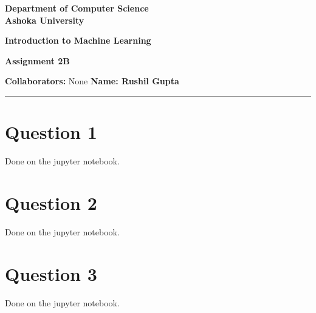 \documentclass[a4paper]{article}
\begin{document}
\begin{center}
{\large \bf \color{red} Department of Computer Science} \\
{\large \bf \color{red} Ashoka University} \\

\vspace{0.1in}

{\large \bf \color{blue} Introduction to Machine Learning}

\vspace{0.05in}

{ \bf \color{YellowOrange} Assignment 2B}
\end{center}
\medskip

{\textbf{Collaborators:} None} \hfill {\textbf{Name: Rushil Gupta} }

\bigskip
\hrule

\section*{Question 1}
Done on the jupyter notebook.

\section*{Question 2}
Done on the jupyter notebook.

\section*{Question 3}
Done on the jupyter notebook.

\newpage
\end{document}
